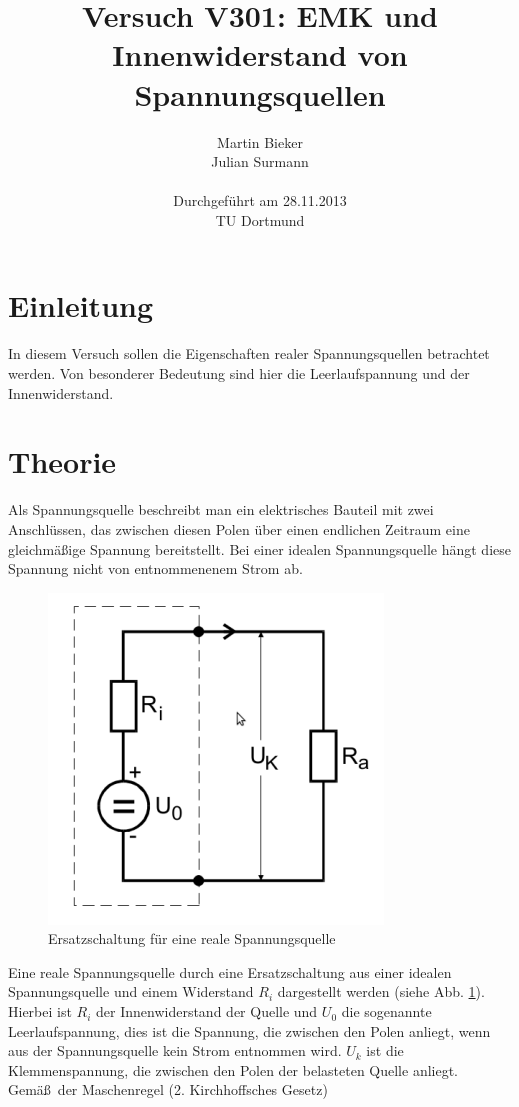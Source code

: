 \documentclass[11pt,ngerman,a4paper]{article}
\title{\textbf{Versuch V301: EMK und Innenwiderstand von Spannungsquellen}}
\author{Martin Bieker\\
		Julian Surmann\\
		\\
		Durchgef\"{u}hrt am 28.11.2013\\
		TU Dortmund}
\date{}
\begin{document}
\renewcommand\tablename{Tabelle}
\renewcommand\figurename{Abbildung}
\maketitle
\thispagestyle{empty}
\newpage
\clearpage
\setcounter{page}{1}

\section{Einleitung}
In diesem Versuch sollen die Eigenschaften realer Spannungsquellen betrachtet werden. Von besonderer Bedeutung sind hier die Leerlaufspannung und der Innenwiderstand.
\section{Theorie}
Als Spannungsquelle beschreibt man ein elektrisches Bauteil mit zwei Anschl\"ussen, das zwischen diesen Polen \"uber einen endlichen Zeitraum eine gleichm\"a\ss ige Spannung bereitstellt. Bei einer idealen Spannungsquelle h\"angt diese Spannung nicht von entnommenenem Strom ab.
\begin{figure}[htp]
\centering
\includegraphics[scale=1.00]{abb3.png}
\caption{Ersatzschaltung f\"ur eine reale Spannungsquelle}
\label{Ersatz}
\end{figure}
Eine reale Spannungsquelle durch eine Ersatzschaltung aus einer idealen Spannungsquelle und einem Widerstand $R_i$ dargestellt werden (siehe Abb. \ref{Ersatz}). Hierbei ist $R_i$ der Innenwiderstand der Quelle und  $U_0$ die sogenannte Leerlaufspannung, dies ist die Spannung, die zwischen den Polen anliegt, wenn aus der Spannungsquelle kein Strom entnommen wird. $U_k$ ist die Klemmenspannung, die zwischen den Polen der belasteten Quelle anliegt. Gem\"a\ss\ der Maschenregel (2. Kirchhoffsches Gesetz)
\end{document}
